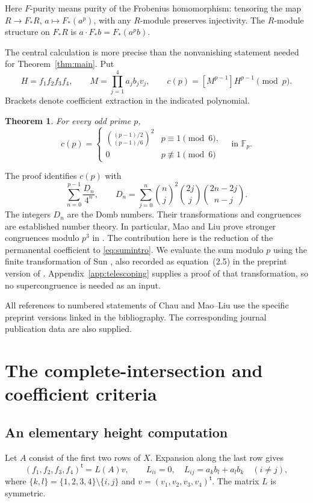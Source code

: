 \documentclass[11pt]{article}
\newtheorem{theorem}{Theorem}[section]
\theoremstyle{remark}\newtheorem{remark}[theorem]{Remark}
\newcommand{\F}{\mathbb F}
\numberwithin{equation}{section}
\begin{document}
Here $F$-purity means purity of the Frobenius homomorphism: tensoring
the map $R\longrightarrow F_*R$, $a\longmapsto F_*(a^p)$, with any
$R$-module preserves injectivity. The $R$-module structure on $F_*R$
is $a\cdot F_*b=F_*(a^pb)$.

The central calculation is more precise than the nonvanishing
statement needed for Theorem~\ref{thm:main}. Put
\[
 H=f_1f_2f_3f_4,\qquad
 M=\prod_{j=1}^{4}a_jb_jv_j,\qquad
 c(p)=[M^{p-1}]H^{p-1}\pmod p.
\]
Brackets denote coefficient extraction in the indicated polynomial.

\begin{theorem}\label{thm:coefficient}
For every odd prime $p$,
\begin{equation}\label{eq:maincoefficient}
 c(p)=
 \begin{cases}
 \displaystyle\binom{(p-1)/2}{(p-1)/6}^{\!2}&p\equiv1\pmod6,\\[6pt]
 0&p\not\equiv1\pmod6
 \end{cases}
 \quad\text{in }\F_p.
\end{equation}
\end{theorem}

The proof identifies $c(p)$ with
\begin{equation}\label{eq:sumintro}
 \sum_{n=0}^{p-1}\frac{D_n}{4^n},\qquad
 D_n=\sum_{j=0}^{n}\binom nj^2\binom{2j}{j}
                         \binom{2n-2j}{n-j}.
\end{equation}
The integers $D_n$ are the Domb numbers. Their transformations and
congruences are established number theory. In particular, Mao and Liu
prove stronger congruences modulo $p^3$ in \cite{ML}. The contribution
here is the reduction of the permanental coefficient to
\eqref{eq:sumintro}. We evaluate the sum modulo $p$ using the finite
transformation of Sun \cite[Lemma~3.1]{Sun}, also recorded as equation~(2.5) in
the preprint version of \cite{ML}. Appendix~\ref{app:telescoping}
supplies a proof of that transformation, so no supercongruence is
needed as an input.

All references to numbered statements of Chau and Mao--Liu use the
specific preprint versions linked in the bibliography. The corresponding
journal publication data are also supplied.

\section{The complete-intersection and coefficient criteria}
\subsection{An elementary height computation}
Let $A$ consist of the first two rows of $X$. Expansion along the last
row gives
\begin{equation}\label{eq:L}
 (f_1,f_2,f_3,f_4)^{\mathsf t}=L(A)v,\qquad
 L_{ii}=0,\quad L_{ij}=a_kb_l+a_lb_k\quad(i\ne j),
\end{equation}
where $\{k,l\}=\{1,2,3,4\}\setminus\{i,j\}$ and
$v=(v_1,v_2,v_3,v_4)^{\mathsf t}$. The matrix $L$ is symmetric.
\end{document}
